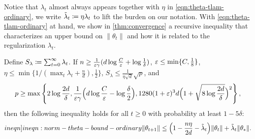 Notice that $\lambda_t$ almost always appears together with $\eta$ in \cref{eqn:theta-tlam-ordinary}, we write $\tilde{\lambda}_t \coloneqq \eta\lambda_t$ to lift the burden on our notation. With \cref{eqn:theta-tlam-ordinary} at hand, we show in \cref{thm:convergence} a recursive inequality that characterizes an upper bound on $\|\theta_t\|$ and how it is related to the regularization $\lambda_t$.
 
\begin{theorem}\label{thm:convergence}
    Define $S_\lambda\coloneqq\sum_{t=0}^\infty\lambda_t$. If $n \geq \frac{1}{\varepsilon\gamma} (d\log\frac{C}{\varepsilon} + \log\frac{1}{\delta})$, $\varepsilon \leq \min\{C,\frac{1}{8}\}$, $\eta\leq \min\{1/(\max_t\lambda_t + \frac{n}{d}),\frac{1}{2}\}$, $S_\lambda\leq \frac{1}{\eta\sqrt{d}}\sqrt{p}$, and
    \begin{align*}
        p \geq \max\left\{2\log\frac{2d}{\delta},\frac{1}{\varepsilon\gamma} \Big(d\log\frac{C}{\varepsilon} - \log\frac{\delta}{2}\Big),1280(1+\varepsilon)^3d \Big(1+\sqrt{8\log\frac{2d}{\delta}}\Big)^2\right\},
    \end{align*}
    then the following inequality holds for all $t\geq 0$ with probability at least $1-5\delta$:
        \begin{align}\label[ineqn]{ineqn:norm-theta-bound-ordinary}
            \|\theta_{t+1}\| \leq \Big(1-\frac{n\eta}{2d}-\tlam_t \Big)\|\theta_t\| + \tlam_t\|\theta_\ast\|. 
        \end{align}
\end{theorem}

